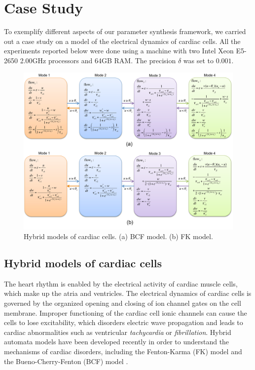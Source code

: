 \section{Case Study}

To exemplify different aspects of our parameter synthesis framework, we carried out a case study on
a model of the electrical dynamics of cardiac cells. All the experiments reported below were done 
using a machine with two Intel Xeon E5-2650 2.00GHz processors and 64GB RAM. The precision $\delta$
was set to $0.001$.

\begin{figure}[t]
\centering
\includegraphics[scale=0.5]{fig-cardiac-new}
\caption{Hybrid models of cardiac cells. (a) BCF model. (b) FK model.}
\label{model}
\end{figure}

\subsection{Hybrid models of cardiac cells}
The heart rhythm is enabled by the electrical activity of cardiac muscle cells, which make up the atria and ventricles. The electrical dynamics of cardiac cells is governed by the organized opening and closing of ion channel gates on the cell membrane. Improper functioning of the cardiac cell ionic channels can cause the cells to lose excitability, which disorders electric wave propagation and leads to cardiac abnormalities such as ventricular \textit{tachycardia} or \textit{fibrillation}. Hybrid automata models have been developed recently in order to understand the mechanisms of cardiac disorders, including the Fenton-Karma (FK) model \cite{fenton98} and the Bueno-Cherry-Fenton (BCF) model \cite{orovio08}. 

